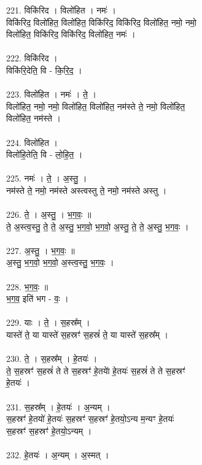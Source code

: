 221. विकि॑रिद । विलो॑हित । नमः॑ ।\\
विकि॑रिद॒ विलो॑हित॒ विलो॑हित॒ विकि॑रिद॒ विकि॑रिद॒ विलो॑हित॒ नमो॒ नमो॒\\
विलो॑हित॒ विकि॑रिद॒ विकि॑रिद॒ विलो॑हित॒ नमः॑ ।\\
\\
222. विकि॑रिद ।\\
विकि॑रि॒देति॒ वि - कि॒रि॒द॒ ।\\
\\
223. विलो॑हित । नमः॑ । ते॒ ।\\
विलो॑हित॒ नमो॒ नमो॒ विलो॑हित॒ विलो॑हित॒ नम॑स्ते ते॒ नमो॒ विलो॑हित॒\\
विलो॑हित॒ नम॑स्ते ।\\
\\
224. विलो॑हित ।\\
विलो॑हि॒तेति॒ वि - लो॒हि॒त॒ ।\\
\\
225. नमः॑ । ते॒ । अ॒स्तु॒ ।\\
नम॑स्ते ते॒ नमो॒ नम॑स्ते अस्त्वस्तु ते॒ नमो॒ नम॑स्ते अस्तु ।\\
\\
226. ते॒ । अ॒स्तु॒ । भ॒ग॒वः॒ ॥\\
ते॒ अ॒स्त्व॒स्तु॒ ते॒ ते॒ अ॒स्तु॒ भ॒ग॒वो॒ भ॒ग॒वो॒ अ॒स्तु॒ ते॒ ते॒ अ॒स्तु॒ भ॒ग॒वः॒ ।\\
\\
227. अ॒स्तु॒ । भ॒ग॒वः॒ ॥\\
अ॒स्तु॒ भ॒ग॒वो॒ भ॒ग॒वो॒ अ॒स्त्व॒स्तु॒ भ॒ग॒वः॒ ।\\
\\
228. भ॒ग॒वः॒ ॥\\
भ॒ग॒व॒ इति॑ भग - वः॒ ।\\
\\
229. याः । ते॒ । स॒हस्र᳚म् ।\\
यास्ते॑ ते॒ या यास्ते॑ स॒हस्रꣳ॑ स॒हस्रं॑ ते॒ या यास्ते॑ स॒हस्र᳚म् ।\\
\\
230. ते॒ । स॒हस्र᳚म् । हे॒तयः॑ ।\\
ते॒ स॒हस्रꣳ॑ स॒हस्रं॑ ते ते स॒हस्रꣳ॑ हे॒तयाे॑ हे॒तयः॑ स॒हस्रं॑ ते ते स॒हस्रꣳ॑\\
हे॒तयः॑ ।\\
\\
231. स॒हस्र᳚म् । हे॒तयः॑ । अ॒न्यम् ।\\
स॒हस्रꣳ॑ हे॒तयो॑ हे॒तयः॑ स॒हस्रꣳ॑ स॒हस्रꣳ॑ हे॒तयो॒ऽन्य म॒न्यꣳ हे॒तयः॑\\
स॒हस्रꣳ॑ स॒हस्रꣳ॑ हे॒तयो॒ऽन्यम् ।\\
\\
232. हे॒तयः॑ । अ॒न्यम् । अ॒स्मत् ।\\
